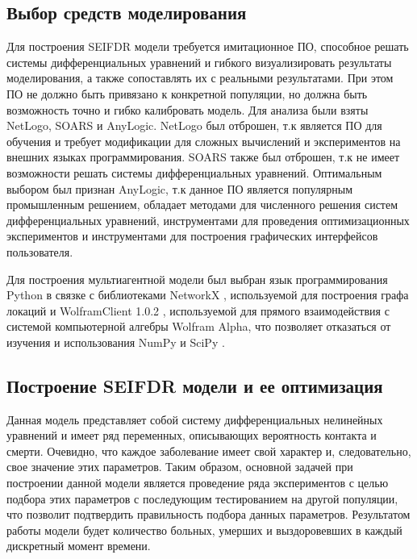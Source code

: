 \subsection{Выбор средств моделирования}

Для построения SEIFDR модели требуется имитационное ПО, способное решать системы дифференциальных уравнений и гибкого визуализировать результаты моделирования, а также сопоставлять их с реальными результатами. При этом ПО не должно быть привязано к конкретной популяции, но должна быть возможность точно и гибко калибровать модель. Для анализа были взяты NetLogo, SOARS  и AnyLogic. NetLogo был отброшен, т.к является ПО для обучения и  требует модификации для сложных вычислений и экспериментов на внешних языках программирования. SOARS также был отброшен, т.к не имеет возможности решать системы дифференциальных уравнений. Оптимальным выбором был признан AnyLogic, т.к данное ПО является популярным промышленным решением, обладает методами для численного решения систем дифференциальных уравнений, инструментами для проведения оптимизационных экспериментов и инструментами для построения графических интерфейсов пользователя.


Для построения мультиагентной модели был выбран язык программирования Python в связке с библиотеками NetworkX %
, используемой для построения графа локаций 
и WolframClient 1.0.2 %
, используемой для прямого взаимодействия с системой компьютерной алгебры Wolfram Alpha, что позволяет отказаться от изучения и использования NumPy и SciPy %
.

\subsection{Построение SEIFDR модели и ее оптимизация}
Данная модель представляет собой систему дифференциальных нелинейных уравнений %
и имеет ряд переменных, описывающих вероятность контакта и смерти. Очевидно, что каждое заболевание имеет свой характер и, следовательно, свое значение этих параметров. Таким образом, основной задачей при построении данной модели является проведение ряда экспериментов с целью подбора этих параметров с последующим тестированием на другой популяции, что позволит подтвердить правильность подбора данных параметров. Результатом работы модели будет  количество больных, умерших и выздоровевших в каждый дискретный момент времени.

